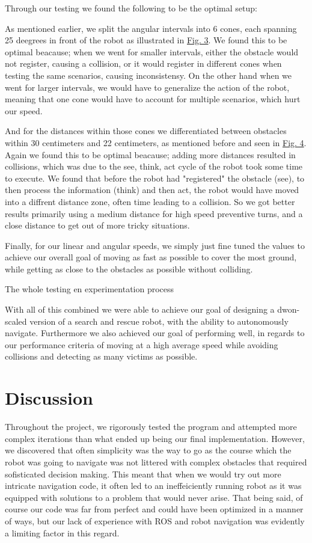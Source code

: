 \documentclass[conference]{IEEEtran}
\begin{document}
Through our testing we found the following to be the optimal setup:

As mentioned earlier, we split the angular intervals into 6 cones, each spanning 25 deegrees in front of the robot as illustrated in \href{sec:angles}{Fig. 3}.
We found this to be optimal beacause; when we went for smaller intervals, either the obstacle would not register, causing a collision, or it would register in different cones when testing the same scenarios, causing inconsistensy.
On the other hand when we went for larger intervals, we would have to generalize the action of the robot, meaning that one cone would have to account for multiple scenarios, which hurt our speed.

And for the distances within those cones we differentiated between obstacles within 30 centimeters and 22 centimeters, as mentioned before and seen in \href{sec:distances}{Fig. 4}.
Again we found this to be optimal beacause; adding more distances resulted in collisions, which was due to the see, think, act cycle of the robot took some time to execute.
We found that before the robot had "registered" the obstacle (see), to then process the information (think) and then act, the robot would have moved into a diffrent distance zone, often time leading to a collision.
So we got better results primarily using a medium distance for high speed preventive turns, and a close distance to get out of more tricky situations.

Finally, for our linear and angular speeds, we simply just fine tuned the values to achieve our overall goal of moving as fast as possible to cover the most ground, while getting as close to the obstacles as possible without colliding.

The whole testing en experimentation process

With all of this combined we were able to achieve our goal of designing a dwon-scaled version of a search and rescue robot, with the ability to autonomously navigate.
Furthermore we also achieved our goal of performing well, in regards to our performance criteria of moving at a high average speed while avoiding collisions and detecting as many victims as possible.

\section{Discussion}
Throughout the project, we rigorously tested the program and attempted more complex iterations than what ended up being our final implementation.
However, we discovered that often simplicity was the way to go as the course which the robot was going to navigate was not littered with complex obstacles that required sofisticated decision making.
This meant that when we would try out more intricate navigation code, it often led to an ineffeiciently running robot as it was equipped with solutions to a problem that would never arise.
That being said, of course our code was far from perfect and could have been optimized in a manner of ways, but our lack of experience with ROS and robot navigation was evidently a limiting factor in this regard.
\end{document}
